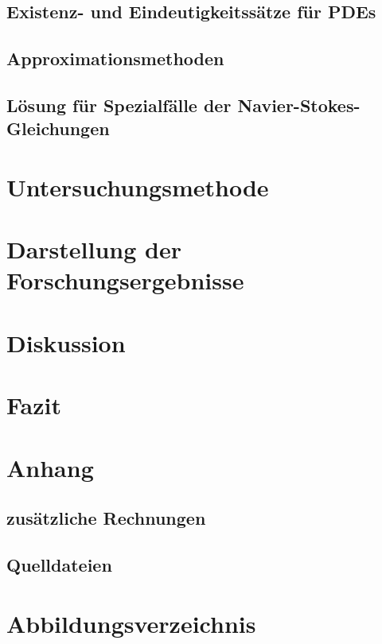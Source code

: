 \documentclass[11pt,a4paper]{article}
\theoremstyle{definition}
\numberwithin{equation}{section} %
\begin{document}


\subsection{Existenz- und Eindeutigkeitssätze für PDEs}



\subsection{Approximationsmethoden}



\subsection{Lösung für Spezialfälle der Navier-Stokes-Gleichungen}

\section{Untersuchungsmethode}



\section{Darstellung der Forschungsergebnisse}

\section{Diskussion}

\section{Fazit}

\section{Anhang}

\subsection{zusätzliche Rechnungen}

\label{sec:rechnungen}



\subsection{Quelldateien}

\section{Abbildungsverzeichnis}

\printbibliography
\end{document}

